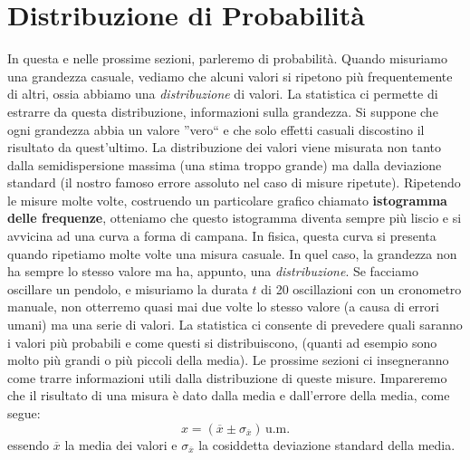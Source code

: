 \section{Distribuzione di Probabilità}
In questa e nelle prossime sezioni, parleremo di probabilità. Quando misuriamo una grandezza casuale, vediamo che alcuni valori si ripetono più frequentemente di altri, ossia abbiamo una \textit{distribuzione} di valori. La statistica ci permette di estrarre da questa distribuzione, informazioni sulla grandezza. Si suppone che ogni grandezza abbia un valore ''vero`` e che solo effetti casuali discostino il risultato da quest'ultimo. La distribuzione dei valori viene misurata non tanto dalla semidispersione massima (una stima troppo grande) ma dalla deviazione standard (il nostro famoso errore assoluto nel caso di misure ripetute). Ripetendo le misure molte volte, costruendo un  particolare grafico chiamato \textbf{istogramma delle frequenze}, otteniamo che questo istogramma diventa sempre  più liscio e  si avvicina ad una curva a forma di campana. In fisica, questa curva si presenta quando ripetiamo molte volte una misura casuale. In quel caso, la grandezza non ha sempre lo stesso valore ma ha, appunto, una \textit{distribuzione}. Se facciamo oscillare un pendolo, e misuriamo la durata $t$ di 20 oscillazioni con un cronometro manuale, non otterremo quasi mai due volte lo stesso valore (a causa di errori umani) ma una serie di valori. La statistica ci consente di prevedere quali saranno i valori più probabili e come questi si distribuiscono, (quanti ad esempio sono molto più grandi o più piccoli della media). Le prossime sezioni ci insegneranno come trarre informazioni utili dalla distribuzione di queste misure. Impareremo che il risultato di una misura è dato dalla media e dall'errore della media, come segue:
\[
x=\left(\overline{x} \pm \sigma_{\overline{x}}\right) \, \text{u.m.}
\]
essendo $\overline{x}$ la media dei valori e $\sigma_{\overline{x}}$ la cosiddetta deviazione standard della media.

